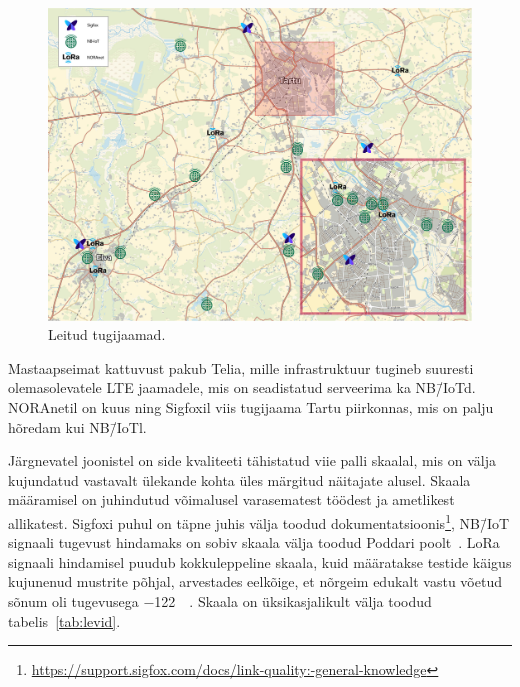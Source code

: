 \documentclass[12pt]{article}
\begin{document}
    \begin{figure} [ht]
        \begin{center}
            \includegraphics[width=\textwidth]{figures/tugijamadzoom2.jpg}
            \caption{Leitud tugijaamad.}
            \label{fig:tugijaamad}
        \end{center}
    \end{figure}

    Mastaapseimat kattuvust pakub Telia, mille infrastruktuur tugineb suuresti olemasolevatele LTE jaamadele, mis on seadistatud serveerima ka NB\=/IoTd.
    NORAnetil on kuus ning Sigfoxil viis tugijaama Tartu piirkonnas, mis on palju hõredam kui NB\=/IoTl.

    Järgnevatel joonistel on side kvaliteeti tähistatud viie palli skaalal, mis on välja kujundatud vastavalt ülekande kohta üles märgitud näitajate alusel.
    Skaala määramisel on juhindutud võimalusel varasematest töödest ja ametlikest allikatest.
    Sigfoxi puhul on täpne juhis välja toodud dokumentatsioonis\footnote{\url{https://support.sigfox.com/docs/link-quality:-general-knowledge}}, NB\=/IoT signaali tugevust hindamaks on sobiv skaala välja toodud Poddari poolt~\cite{poddar2020}.
    LoRa signaali hindamisel puudub kokkuleppeline skaala, kuid määratakse testide käigus kujunenud mustrite põhjal, arvestades eelkõige, et nõrgeim edukalt vastu võetud sõnum oli tugevusega \SI{-122}{\deci\belm}.
    Skaala on üksikasjalikult välja toodud tabelis~\ref{tab:levid}.
\end{document}
